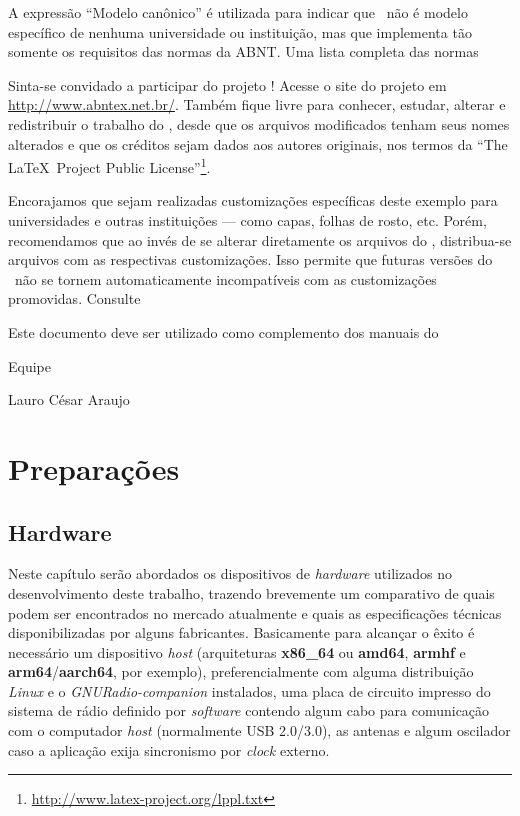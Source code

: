\documentclass[
  12pt,				%
  openright,			%
  twoside,			%
  a4paper,			%
  english,			%
  french,				%
  spanish,			%
  brazil,				%
  ]{abntex2}
\begin{document}
A expressão ``Modelo canônico'' é utilizada para indicar que \abnTeX\ não é
modelo específico de nenhuma universidade ou instituição, mas que implementa tão
somente os requisitos das normas da ABNT. Uma lista completa das normas

Sinta-se convidado a participar do projeto \abnTeX! Acesse o site do projeto em
\url{http://www.abntex.net.br/}. Também fique livre para conhecer,
estudar, alterar e redistribuir o trabalho do \abnTeX, desde que os arquivos
modificados tenham seus nomes alterados e que os créditos sejam dados aos
autores originais, nos termos da ``The \LaTeX\ Project Public
License''\footnote{\url{http://www.latex-project.org/lppl.txt}}.

Encorajamos que sejam realizadas customizações específicas deste exemplo para
universidades e outras instituições --- como capas, folhas de rosto, etc.
Porém, recomendamos que ao invés de se alterar diretamente os arquivos do
\abnTeX, distribua-se arquivos com as respectivas customizações.
Isso permite que futuras versões do \abnTeX~não se tornem automaticamente
incompatíveis com as customizações promovidas. Consulte

Este documento deve ser utilizado como complemento dos manuais do \abnTeX\

Equipe \abnTeX

Lauro César Araujo


\part{Preparações}

\chapter{Hardware}

Neste capítulo serão abordados os dispositivos de \textit{hardware} utilizados no desenvolvimento deste trabalho, trazendo brevemente um comparativo de quais
podem ser encontrados no mercado atualmente e quais as especificações técnicas disponibilizadas por alguns fabricantes. Basicamente para alcançar o êxito
é necessário um dispositivo \textit{host} (arquiteturas \textbf{x86\_64} ou \textbf{amd64}, \textbf{armhf} e \textbf{arm64}/\textbf{aarch64}, por exemplo),
preferencialmente com alguma distribuição \textit{Linux} e o \textit{GNURadio-companion} instalados, uma placa de circuito impresso do sistema de rádio
definido por \textit{software} contendo algum cabo para comunicação com o computador \textit{host} (normalmente USB 2.0/3.0), as antenas e algum oscilador
caso a aplicação exija sincronismo por \textit{clock} externo.
\end{document}
